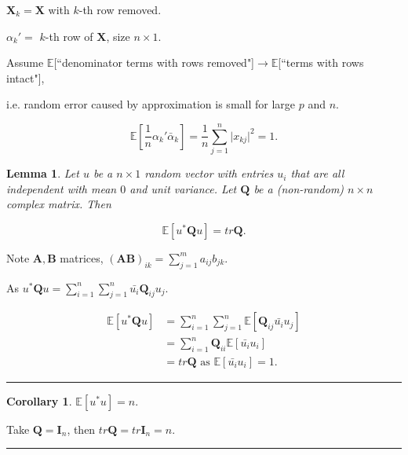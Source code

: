 \documentclass[twoside]{article}
\newcommand*\mean[1]{\bar{#1}}
\newtheorem{lemma}[theorem]{Lemma}
\newtheorem{corollary}[theorem]{Corollary}
\newenvironment{proof}{{\bf Proof:}}{\hfill\rule{2mm}{2mm}}
\begin{document}
$\mathbf{X}_k=\mathbf{X}$ with $k$-th row removed.

$\alpha_k'=$ $k$-th row of $\mathbf{X}$, size $n\times 1$.

Assume $\mathbb{E}$[``denominator terms with rows removed"]$\to\mathbb{E}$[``terms with rows intact"],

i.e. random error caused by approximation is small for large $p$ and $n$.

$$\mathbb{E}\left[\frac{1}{n}\alpha_k'\mean{\alpha}_k\right]=\frac{1}{n}\sum^n_{j=1}\lvert x_{kj}\rvert ^2=1.$$ 

\begin{lemma}
	Let $u$ be a $n\times 1$ random vector with entries $u_i$ that are all independent with mean $0$ and unit variance. Let $\mathbf{Q}$ be a (non-random) $n\times n$ complex matrix. Then
	
	$$\mathbb{E}\left[u^*\mathbf{Q} u\right]=tr\mathbf{Q}.$$
\end{lemma}

Note $\mathbf{A},\mathbf{B}$ matrices, $(\mathbf{A}\mathbf{B})_{ik}=\sum^m_{j=1}a_{ij}b_{jk}.$

\begin{proof}
	As $u^*\mathbf{Q}u=\sum^n_{i=1}\sum^n_{j=1}\mean{u_i}\mathbf{Q}_{ij}u_j$.
	
	\begin{equation}
		\begin{split}
			\mathbb{E}\left[u^*\mathbf{Q}u\right] &=\sum^n_{i=1}\sum^n_{j=1}\mathbb{E}\left[\mathbf{Q}_{ij}\mean{u_i}u_j\right]\\
			&=\sum^n_{i=1}\mathbf{Q}_{ii}\mathbb{E}\left[\mean{u_i}u_i\right]\\
			&=tr\mathbf{Q}\text{ as } \mathbb{E}[\mean{u_i}u_i]=1.
		\end{split}
	\end{equation}
\end{proof}

\begin{corollary}
	$\mathbb{E}\left[u^*u\right]=n.$
\end{corollary}

\begin{proof}
	Take $\mathbf{Q}=\mathbf{I}_n$, then $tr\mathbf{Q}=tr\mathbf{I}_n=n$.
\end{proof}
\end{document}
